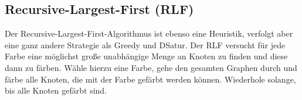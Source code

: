 \documentclass[10pt,a4paper,landscape]{article}
\begin{document}
\begin{multicols*}{2}
    \subsection{ Recursive-Largest-First (RLF) }
    Der Recursive-Largest-First-Algorithmus ist ebenso eine Heuristik, verfolgt aber eine ganz andere Strategie als Greedy und DSatur. Der RLF versucht für jede 
    Farbe eine möglichst große unabhängige Menge an Knoten zu finden und diese dann zu färben. Wähle hierzu eine Farbe, gehe den gesamten Graphen durch und färbe 
    alle Knoten, die mit der Farbe gefärbt werden können. Wiederhole solange, bis alle Knoten gefärbt sind.
    

\end{multicols*}
\end{document}
